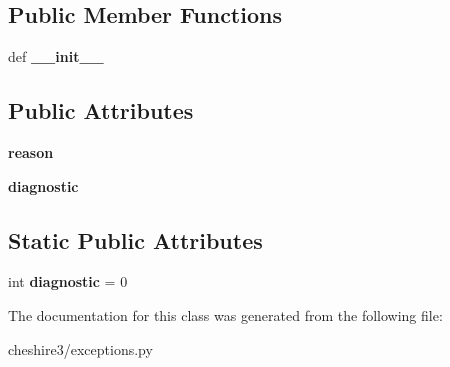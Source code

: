 \subsection*{Public Member Functions}
\begin{DoxyCompactItemize}
\item 
\hypertarget{classcheshire3_1_1exceptions_1_1_query_exception_a132d026157ac7e13c39c6d3bda8cdda6}{def {\bfseries \-\_\-\-\_\-init\-\_\-\-\_\-}}\label{classcheshire3_1_1exceptions_1_1_query_exception_a132d026157ac7e13c39c6d3bda8cdda6}

\end{DoxyCompactItemize}
\subsection*{Public Attributes}
\begin{DoxyCompactItemize}
\item 
\hypertarget{classcheshire3_1_1exceptions_1_1_query_exception_a021ec1a1f2df50958e3425e46953d854}{{\bfseries reason}}\label{classcheshire3_1_1exceptions_1_1_query_exception_a021ec1a1f2df50958e3425e46953d854}

\item 
\hypertarget{classcheshire3_1_1exceptions_1_1_query_exception_a2a5fc28a0242b86809c15a5e34fa02fe}{{\bfseries diagnostic}}\label{classcheshire3_1_1exceptions_1_1_query_exception_a2a5fc28a0242b86809c15a5e34fa02fe}

\end{DoxyCompactItemize}
\subsection*{Static Public Attributes}
\begin{DoxyCompactItemize}
\item 
\hypertarget{classcheshire3_1_1exceptions_1_1_query_exception_a5ead145debd42d37cc34eb1595cb9ea0}{int {\bfseries diagnostic} = 0}\label{classcheshire3_1_1exceptions_1_1_query_exception_a5ead145debd42d37cc34eb1595cb9ea0}

\end{DoxyCompactItemize}


The documentation for this class was generated from the following file\-:\begin{DoxyCompactItemize}
\item 
cheshire3/exceptions.\-py\end{DoxyCompactItemize}
